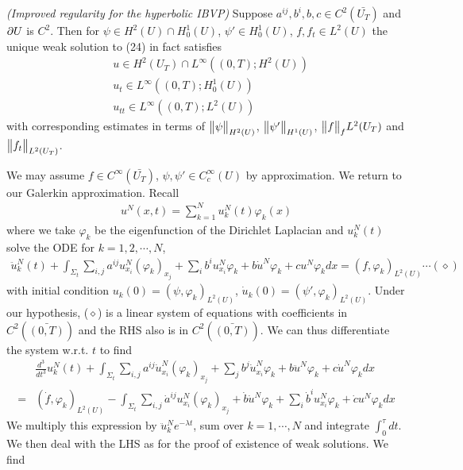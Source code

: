 \documentclass[12pt,a4paper]{report}
\newenvironment{proof}
{\begin{changemargin}{1cm}{0.5cm} 
	}%
	{\end{changemargin}
}
\begin{document}
\thm \emph{(Improved regularity for the hyperbolic IBVP)} Suppose $a^{ij}, b^i,b,c\in C^2(\bar{U_T})$ and $\partial U$ is $C^2$. Then for $\psi\in H^2(U)\cap H_0^1(U)$, $\psi'\in H_0^1(U)$, $f,f_t\in L^2(U)$ the unique weak solution to (24) in fact satisfies
\begin{align*}
& u\in H^2(U_T)\cap L^{\infty}((0,T); H^2(U))\\
& u_t \in L^{\infty}((0,T); H_0^1(U))\\
& u_{tt} \in L^{\infty}((0,T); L^2(U))
\end{align*} 
with corresponding estimates in terms of $\bigl\lVert\psi\bigr\rVert_{H^2(U)}$, $\bigl\lVert\psi'\bigr\rVert_{H^1(U)}$, $\bigl\lVert f\bigr\rVert_{f}{L^2(U_T)}$ and $\bigl\lVert f_t\bigr\rVert_{L^2(U_T)}$.
\begin{proof}
\pf We may assume $f\in C^{\infty}(\bar{U_T})$, $\psi, \psi'\in C_c^{\infty}(U)$ by approximation. We return to our Galerkin approximation. Recall
\begin{align*}
u^N(x,t) = \sum_{k=1}^N u_k^N(t)\varphi_k(x)
\end{align*} 
where we take $\varphi_k$ be the eigenfunction of the Dirichlet Laplacian and $u_k^N(t)$ solve the ODE for $k=1, 2, \cdots, N$, 
\begin{align*}
\ddot{u}_k^N (t) + \int_{\Sigma_t}\sum_{i,j}a^{ij}u_{x_i}^N (\varphi_k)_{x_j} + \sum_i b^i u_{x_i}^N \varphi_k + b \dot{u}^N \varphi_k + cu^N \varphi_k dx= (f, \varphi_k)_{L^2(U)} \cdots (\diamond)
\end{align*} 
with initial condition $u_k(0) = (\psi, \varphi_k)_{L^2(U)}$, $\dot{u}_k (0) = (\psi', \varphi_k)_{L^2(U)}$. Under our hypothesis, ($\diamond$) is a linear system of equations with coefficients in $C^2(\bar{(0,T)})$ and the RHS also is in $C^2(\bar{(0,T)})$. We can thus differentiate the system w.r.t. $t$ to find
\begin{align*}
&\frac{d^3}{dt^3}u_k^N(t) + \int_{\Sigma_t}\sum_{i,j}a^{ij}\dot{u}_{x_i}^N (\varphi_k)_{x_j} + \sum_j b^j \dot{u}_{x_i}^N \varphi_k + b \ddot{u}^N \varphi_k + c\dot{u}^N \varphi_k dx\\
=& (\dot{f}, \varphi_k)_{L^2(U)} - \int_{\Sigma_t}\sum_{i,j} \dot{a}^{ij} u_{x_i}^N (\varphi_k)_{x_j}+ \dot{b}\dot{u}^N \varphi_k + \sum_i \dot{b}^i u_{x_i}^N \varphi_k + \dot{c}u^N \varphi_k dx
\end{align*}
We multiply this expression by $\ddot{u}_k^N e^{-\lambda t}$, sum over $k=1, \cdots, N$ and integrate $\int_0^{\tau} dt$. We then deal with the LHS as for the proof of existence of weak solutions. We find
\begin{align*}

\end{align*}
\end{proof}
\end{document}
